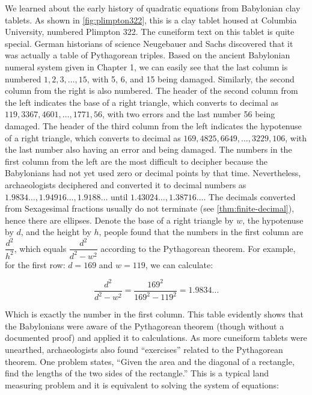 \documentclass[b5paper]{article}
\begin{document}
We learned about the early history of quadratic equations from Babylonian clay tablets. As shown in \cref{fig:plimpton322}, this is a clay tablet housed at Columbia University, numbered Plimpton 322. The cuneiform text on this tablet is quite special. German historians of science Neugebauer and Sachs discovered that it was actually a table of Pythagorean triples. Based on the ancient Babylonian numeral system given in Chapter 1, we can easily see that the last column is numbered $1, 2, 3, \dotsc, 15$, with 5, 6, and 15 being damaged. Similarly, the second column from the right is also numbered. The header of the second column from the left indicates the base of a right triangle, which converts to decimal as $119, 3367, 4601, \dotsc, 1771, 56$, with two errors and the last number 56 being damaged. The header of the third column from the left indicates the hypotenuse of a right triangle, which converts to decimal as $169, 4825, 6649, \dotsc, 3229, 106$, with the last number also having an error and being damaged. The numbers in the first column from the left are the most difficult to decipher because the Babylonians had not yet used zero or decimal points by that time. Nevertheless, archaeologists deciphered and converted it to decimal numbers as $1.9834\dotso, 1.94916\dotso, 1.9188\dotso$ until $1.43024\dotso, 1.38716\dotso$. The decimals converted from Sexagesimal fractions usually do not terminate (see \cref{thm:finite-decimal}), hence there are ellipses. Denote the base of a right triangle by $w$, the hypotenuse by $d$, and the height by $h$, people found that the numbers in the first column are $\dfrac{d^2}{h^2}$, which equals $\dfrac{d^2}{d^2 - w^2}$ according to the Pythagorean theorem. For example, for the first row: $d = 169$ and $w = 119$, we can calculate:

\[
\frac{d^2}{d^2 - w^2} = \frac{169^2}{169^2 - 119^2} = 1.9834\dotso
\]

Which is exactly the number in the first column. This table evidently shows that the Babylonians were aware of the Pythagorean theorem (though without a documented proof) and applied it to calculations. As more cuneiform tablets were unearthed, archaeologists also found \enquote{exercises} related to the Pythagorean theorem. One problem states, \enquote{Given the area and the diagonal of a rectangle, find the lengths of the two sides of the rectangle.} This is a typical land measuring problem and it is equivalent to solving the system of equations:
\end{document}
